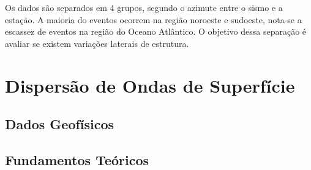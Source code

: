 Os dados são separados em 4 grupos, segundo o azimute entre o sismo e a estação. A maioria do eventos ocorrem na região noroeste e sudoeste, nota-se a escassez de eventos na região do Oceano Atlântico. O objetivo dessa separação é avaliar se existem variações laterais de estrutura.


\section*{Dispersão de Ondas de Superfície}
\subsection*{Dados Geofísicos}
\subsection*{Fundamentos Teóricos}